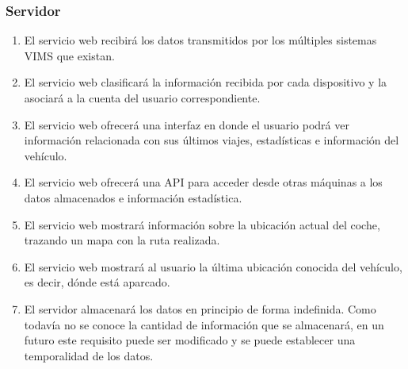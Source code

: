 \subsubsection{Servidor}
\begin{enumerate}[resume, label=\textbf{\texttt{RF-\arabic*}}]
  \item\label{req:reception} El servicio web recibirá los datos transmitidos por los
        múltiples sistemas \ac{VIMS} que existan.
  \item\label{req:management} El servicio web clasificará la información recibida
        por cada dispositivo y la asociará a la cuenta del usuario correspondiente.
  \item\label{req:visualization} El servicio web ofrecerá una interfaz en donde
        el usuario podrá ver información relacionada con sus últimos viajes,
        estadísticas e información del vehículo.
  \item\label{req:api} El servicio web ofrecerá una \ac{API} para acceder
        desde otras máquinas a los datos almacenados e
        información estadística.
  \item\label{req:gps-follow} El servicio web mostrará información sobre la
        ubicación actual del coche, trazando un mapa con la ruta realizada.
  \item\label{req:server-parking} El servicio web mostrará al usuario la última
        ubicación conocida del vehículo, es decir, dónde está aparcado.
  \item\label{req:data-duration} El servidor almacenará los datos en principio de
        forma indefinida. Como todavía no se conoce la cantidad de información
        que se almacenará, en un futuro este requisito puede ser modificado y
        se puede establecer una temporalidad de los datos.
\end{enumerate}

